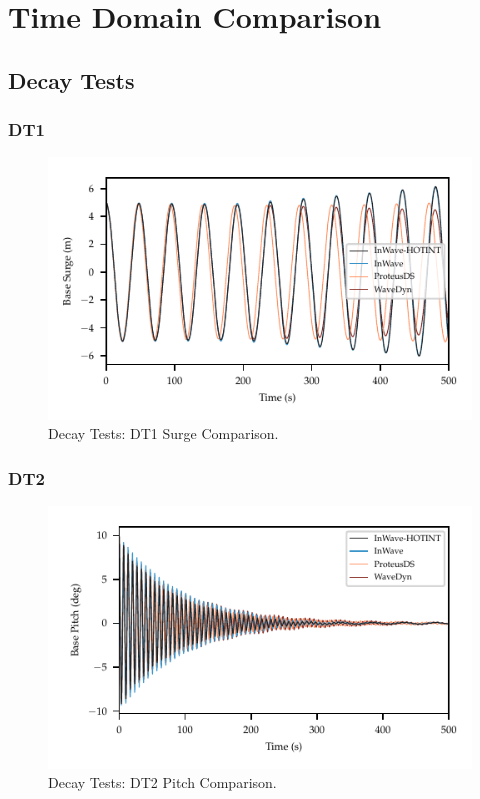 \documentclass[11pt]{article}
\begin{document}
\clearpage
\clearpage
\section{Time Domain Comparison}
\label{sec:org0e95c37}
\subsection{Decay Tests}
\label{sec:orgcf6146f}
\subsubsection{DT1}
\label{sec:orge5c01d0}
\begin{figure}[htbp]
\centering
\includegraphics[width=.9\linewidth]{images/dt/DT1_SURGE.pdf}
\caption{Decay Tests: DT1 Surge Comparison.}
\end{figure}

\clearpage
\subsubsection{DT2}
\label{sec:org6f61678}
\begin{figure}[htbp]
\centering
\includegraphics[width=.9\linewidth]{images/dt/DT2_PITCH.pdf}
\caption{Decay Tests: DT2 Pitch Comparison.}
\end{figure}
\end{document}

